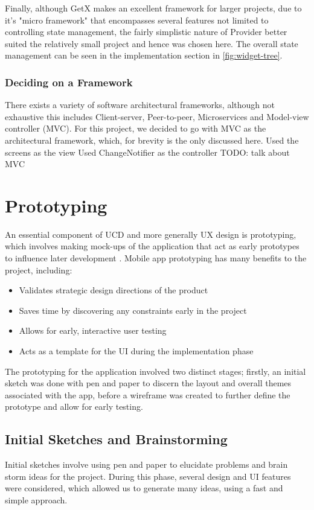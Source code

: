 \documentclass[12pt]{article}
\begin{document}
	 Finally, although GetX makes an excellent framework for larger projects, due to it's "micro framework" that encompasses several features not limited to controlling state management, the fairly simplistic nature of Provider better suited the relatively small project and hence was chosen here. The overall state management can be seen in the implementation section in \ref{fig:widget-tree}.
	 	
	 	
	


	\subsubsection{Deciding on a Framework}
	There exists a variety of software architectural frameworks, although not exhaustive this includes Client-server, Peer-to-peer, Microservices and Model-view controller (MVC). For this project, we decided to go with MVC as the architectural framework, which, for brevity is the only discussed here.
	Used the screens as the view
	Used ChangeNotifier as the controller
	TODO: talk about MVC
	
	\section{Prototyping}
	An essential component of UCD and more generally UX design is prototyping, which involves making mock-ups of the application that act as early prototypes to influence later development \cite{arnowitzChapter15Wireframe2007}. Mobile app prototyping has many benefits to the project, including:
	\begin{itemize}
		\item Validates strategic design directions of the product
		\item Saves time by discovering any constraints early in the project
		\item Allows for early, interactive user testing
		\item Acts as a template for the UI during the implementation phase
	\end{itemize}
	 
	
	The prototyping for the application involved two distinct stages; firstly, an initial sketch was done with pen and paper to discern the layout and overall themes associated with the app, before a wireframe was created to further define the prototype and allow for early testing.
	
	\subsection{Initial Sketches and Brainstorming}
	Initial sketches involve using pen and paper to elucidate problems and brain storm ideas for the project. During this phase, several design and UI features were considered, which allowed us to generate many ideas, using a fast and simple approach.
	
\end{document}
